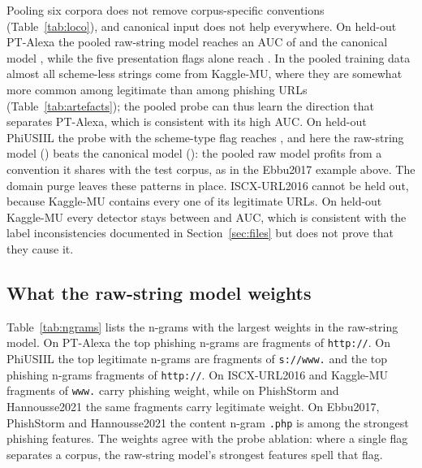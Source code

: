 


Pooling six corpora does not remove corpus-specific conventions (Table~\ref{tab:loco}), and canonical input does not help everywhere. On held-out PT-Alexa the pooled raw-string model reaches an AUC of \LAUrlPTAlexaCharRaw{} and the canonical model \LAUrlPTAlexaCharCanon, while the five presentation flags alone reach \LAUrlPTAlexaPresentation. In the pooled training data almost all scheme-less strings come from Kaggle-MU, where they are somewhat more common among legitimate than among phishing URLs (Table~\ref{tab:artefacts}); the pooled probe can thus learn the direction that separates PT-Alexa, which is consistent with its high AUC. On held-out PhiUSIIL the probe with the scheme-type flag reaches \LAUrlPhiUSIILPresentationHttps, and here the raw-string model (\LAUrlPhiUSIILCharRaw) beats the canonical model (\LAUrlPhiUSIILCharCanon): the pooled raw model profits from a convention it shares with the test corpus, as in the Ebbu2017 example above. The domain purge leaves these patterns in place. ISCX-URL2016 cannot be held out, because Kaggle-MU contains every one of its legitimate URLs. On held-out Kaggle-MU every detector stays between \LAUrlKaggleMUPresentation{} and \LAUrlKaggleMUCharCanon{} AUC, which is consistent with the label inconsistencies documented in Section~\ref{sec:files} but does not prove that they cause it.



\subsection{What the raw-string model weights}
\label{sec:ngrams}
Table~\ref{tab:ngrams} lists the n-grams with the largest weights in the raw-string model. On PT-Alexa the top phishing n-grams are fragments of \texttt{http://}. On PhiUSIIL the top legitimate n-grams are fragments of \texttt{s://www.} and the top phishing n-grams fragments of \texttt{http://}. On ISCX-URL2016 and Kaggle-MU fragments of \texttt{www.} carry phishing weight, while on PhishStorm and Hannousse2021 the same fragments carry legitimate weight. On Ebbu2017, PhishStorm and Hannousse2021 the content n-gram \texttt{.php} is among the strongest phishing features. The weights agree with the probe ablation: where a single flag separates a corpus, the raw-string model's strongest features spell that flag.



